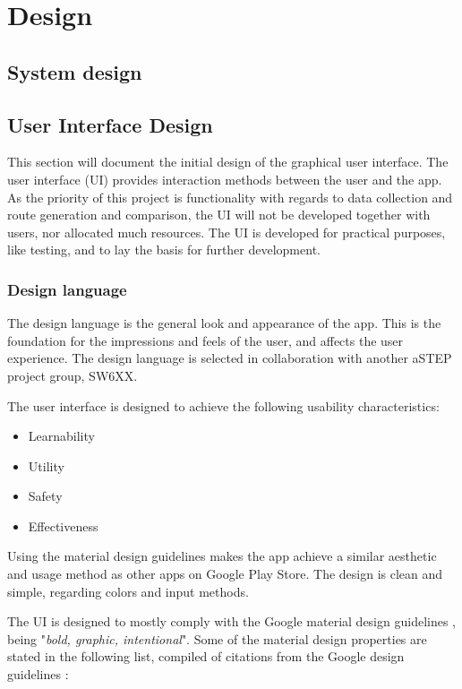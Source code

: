 \section{Design}

\subsection{System design}


\subsection{User Interface Design}
This section will document the initial design of the graphical user interface.
The user interface (UI) provides interaction methods between the user and the app.
As the priority of this project is functionality with regards to data collection and route generation and comparison, the UI will not be developed together with users, nor allocated much resources. 
The UI is developed for practical purposes, like testing, and to lay the basis for further development. 

\subsubsection{Design language}
The design language is the general look and appearance of the app.
This is the foundation for the impressions and feels of the user, and affects the user experience.
The design language is selected in collaboration with another aSTEP project group, SW6XX. 

The user interface is designed to achieve the following usability characteristics: 
\begin{itemize}
	\item Learnability
	\item Utility
	\item Safety
	\item Effectiveness
\end{itemize}

Using the material design guidelines makes the app achieve a similar aesthetic and usage method as other apps on Google Play Store. 
The design is clean and simple, regarding colors and input methods. 

The UI is designed to mostly comply with the Google material design guidelines \cite{materialDesign}, being "\textit{bold, graphic, intentional}". 
Some of the material design properties are stated in the following list, compiled of citations from the Google design guidelines \cite{materialProperties}:

